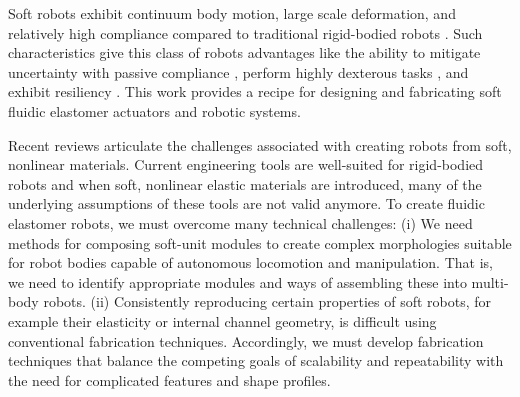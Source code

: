 Soft robots exhibit continuum body motion, large scale deformation, and relatively high compliance compared to traditional rigid-bodied robots \citep{trivedi2008soft}.
%
Such characteristics give this class of robots advantages like the ability to mitigate uncertainty with passive compliance \citep{mcmahan2006field}, perform highly dexterous tasks \citep{deimel2014novel}, and exhibit resiliency \citep{tolley2014resilient}.
%
This work provides a recipe for designing and fabricating soft fluidic elastomer actuators and robotic systems. %

Recent reviews \citep{trivedi2008soft, trimmer2014journal, lipson2014challenges, majidi2014soft} articulate the challenges associated with creating robots from soft, nonlinear materials.
%
Current engineering tools are well-suited for rigid-bodied robots and when soft, nonlinear elastic materials are introduced, many of the underlying assumptions of these tools are not valid anymore.
%
To create fluidic elastomer robots, we must overcome many technical challenges:
(i) We need methods for composing soft-unit modules to create complex morphologies suitable for robot bodies capable of autonomous locomotion and manipulation.
That is, we need to identify appropriate modules and ways of assembling these into multi-body robots.
(ii) Consistently reproducing certain properties of soft robots, for example their elasticity or internal channel geometry, is difficult using conventional fabrication techniques.
Accordingly, we must develop fabrication techniques that balance the competing goals of scalability and repeatability with the need for complicated features and shape profiles.

